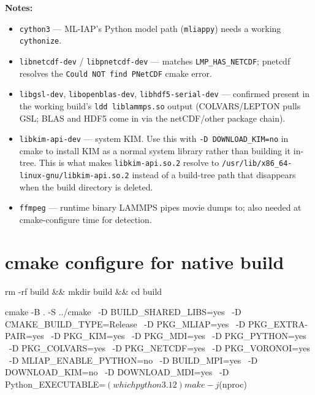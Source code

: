 \documentclass[11pt]{article}
\begin{document}
\textbf{Notes:}
\begin{itemize}
  \item \texttt{cython3} --- ML-IAP's Python model path (\texttt{mliappy})
    needs a working \texttt{cythonize}.
  \item \texttt{libnetcdf-dev} / \texttt{libpnetcdf-dev} --- matches
    \texttt{LMP\_HAS\_NETCDF}; pnetcdf resolves the
    \texttt{Could NOT find PNetCDF} cmake error.
  \item \texttt{libgsl-dev}, \texttt{libopenblas-dev}, \texttt{libhdf5-serial-dev}
    --- confirmed present in the working build's \texttt{ldd liblammps.so}
    output (COLVARS/LEPTON pulls GSL; BLAS and HDF5 come in via the
    netCDF/other package chain).
  \item \texttt{libkim-api-dev} --- system KIM.  Use this with
    \texttt{-D DOWNLOAD\_KIM=no} in cmake to install KIM as a normal system
    library rather than building it in-tree.  This is what makes
    \texttt{libkim-api.so.2} resolve to
    \texttt{/usr/lib/x86\_64-linux-gnu/libkim-api.so.2} instead of a build-tree
    path that disappears when the build directory is deleted.
  \item \texttt{ffmpeg} --- runtime binary LAMMPS pipes movie dumps to; also
    needed at cmake-configure time for detection.
\end{itemize}

\section{cmake configure for native build}

\begin{codebox}
rm -rf build && mkdir build && cd build

cmake -B . -S ../cmake \
    -D BUILD_SHARED_LIBS=yes \
    -D CMAKE_BUILD_TYPE=Release \
    -D PKG_MLIAP=yes \
    -D PKG_EXTRA-PAIR=yes \
    -D PKG_KIM=yes \
    -D PKG_MDI=yes \
    -D PKG_PYTHON=yes \
    -D PKG_COLVARS=yes \
    -D PKG_NETCDF=yes \
    -D PKG_VORONOI=yes \
    -D MLIAP_ENABLE_PYTHON=no \
    -D BUILD_MPI=yes \
    -D DOWNLOAD_KIM=no \
    -D DOWNLOAD_MDI=yes \
    -D Python_EXECUTABLE=$(which python3.12)

make -j$(nproc)
\end{codebox}
\end{document}
